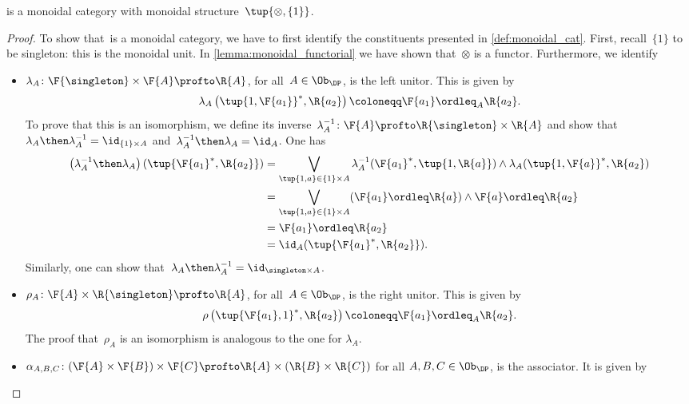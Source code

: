 \begin{lemma}
\DP is a monoidal category with monoidal structure~$\tup{\otimes, \{1\}}$.
\end{lemma}
\begin{proof}
To show that~\DP is a monoidal category, we have to first identify the constituents presented in \cref{def:monoidal_cat}. First, recall~$\{1\}$ to be singleton: this is the monoidal unit. In \cref{lemma:monoidal_functorial} we have shown that~$\otimes$ is a functor. Furthermore, we identify
\begin{itemize}
    \item $\lambda_A \colon \F{\singleton} \times \F{A} \profto \R{A}$, for all~$A\in \Ob_\DP$, is the left unitor. This is given by
    \begin{equation}
        \lambda_A\left( \tup{1,\F{a_1}}^*,\R{a_2}\right)\coloneqq \F{a_1}\ordleq_A \R{a_2}.
    \end{equation}
    To prove that this is an isomorphism, we define its inverse~$\lambda_A^{-1}\colon \F{A}\profto \R{\singleton} \times \R{A}$ and show that~$\lambda_A\then \lambda_A^{-1}=\id_{\{1\}\times A}$ and~$\lambda_A^{-1}\then \lambda_A=\id_{A}$. One has
    \begin{equation}
        \begin{aligned}
           \left( \lambda_A^{-1}\then \lambda_A\right)(\tup{\F{a_1}^*,\R{a_2}})&= \bigvee_{\tup{1,a}\in  \{1\}\times A} \lambda_A^{-1}(\F{a_1}^*,\tup{1,\R{a}})\wedge \lambda_A(\tup{1,\F{a}}^*,\R{a_2})\\
           &= \bigvee_{\tup{1,a}\in  \{1\}\times A}(\F{a_1}\ordleq \R{a}) \wedge \F{a}\ordleq \R{a_2}\\
           &=\F{a_1}\ordleq \R{a_2}\\
           &=\id_A(\tup{\F{a_1}^*,\R{a_2}}).
        \end{aligned}
    \end{equation}
    Similarly, one can show that~$\lambda_A\then \lambda_A^{-1}=\id_{\singleton \times A}$.
    \item $\rho_A\colon \F{A} \times \R{\singleton} \profto \R{A}$, for all~$A\in \Ob_\DP$, is the right unitor. This is given by
    \begin{equation}
        \rho\left( \tup{\F{a_1},1}^*,\R{a_2}\right)\coloneqq \F{a_1}\ordleq_A \R{a_2}.
    \end{equation}
    The proof that~$\rho_A$ is an isomorphism is analogous to the one for $\lambda_A$.
    \item $\alpha_{A,B,C}\colon (\F{A}\times \F{B})\times \F{C} \profto \R{A} \times (\R{B}\times \R{C})$ for all $A,B,C \in \Ob_\DP$, is the associator. It is given by

\end{itemize}
\end{proof}
